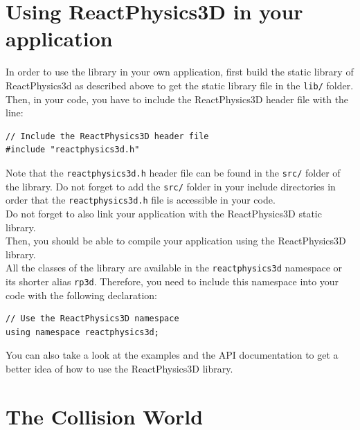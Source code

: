 \documentclass[a4paper,12pt]{article}
\begin{document}
    \section{Using ReactPhysics3D in your application}

    In order to use the library in your own application, first build
    the static library of ReactPhysics3d as described above to get the
    static library file in the \texttt{lib/} folder. Then, in your code, you have to include
    the ReactPhysics3D header file with the line: \\

    \begin{lstlisting}
// Include the ReactPhysics3D header file
#include "reactphysics3d.h"
  \end{lstlisting}

    \vspace{0.6cm}

    Note that the \texttt{reactphysics3d.h} header file can be found in the
    \texttt{src/} folder of the library. Do not forget to add the
    \texttt{src/} folder in your include directories in order that the
    \texttt{reactphysics3d.h} file is accessible in your code. \\

    Do not forget to also link your application with the ReactPhysics3D
    static library.  \\

    Then, you should be able to compile your application using the
    ReactPhysics3D library. \\

    All the classes of the library are available in the \texttt{reactphysics3d} namespace or its shorter alias
    \texttt{rp3d}. Therefore, you need to include this namespace into your code with the following declaration: \\

    \begin{lstlisting}
// Use the ReactPhysics3D namespace
using namespace reactphysics3d;
    \end{lstlisting}

    \vspace{0.6cm}

    You can also take a look at the examples and the API documentation to get a better idea of how to use the
    ReactPhysics3D library.

   \section{The Collision World}
\end{document}
